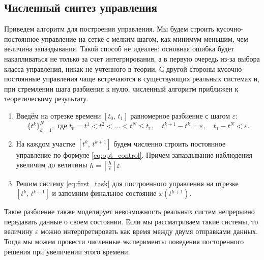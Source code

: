 \subsection{Численный синтез управления}

Приведем алгоритм для построения управления. Мы будем строить кусочно-постоянное управление на сетке с мелким шагом, как минимум меньшим, чем величина запаздывания. Такой способ не идеален: основная ошибка будет накапливаться не только за счет интегрирования, а в первую очередь из-за выбора класса управления, никак не учтенного в теории. С другой стороны кусочно-постоянные управления чаще встречаются в существующих реальных системах и, при стремлении шага разбиения к нулю, численный алгоритм приближен к теоретическому результату.
\begin{enumerate}
        \item Введём на отрезке времени $[t_0,\,t_1]$ равномерное разбиение с шагом $\varepsilon$:
$$
        \{t^k\}_{k=1}^{N},\mbox{ где }
        t_0 = t^1 < t^2 <\ldots<t^N \leqslant t_1,
        \quad t^{k+1} - t^k = \varepsilon,
        \quad t_1 - t^N < \varepsilon.
$$
        \item На каждом участке $[t^k,\,t^{k+1}]$ будем численно строить постоянное управление по формуле \eqref{eq:opt_control}. Причем запаздывание наблюдения увеличим до величины $\tilde h = \left\lceil\frac{h}{\varepsilon}\right\rceil\varepsilon$.
        \item Решим систему \eqref{eq:first_task} для построенного управления на отрезке $[t^k,\,t^{k+1}]$ и запомним финальное состояние $x(t^{k+1})$.
\end{enumerate}

Такое разбиение также моделирует невозможность реальных систем непрерывно передавать данные о своем состоянии. Если мы рассматриваем такие системы, то величину $\varepsilon$ можно интерпретировать как время между двумя отправками данных. Тогда мы можем провести численные эксперименты поведения посторенного решения при увеличении этого времени.